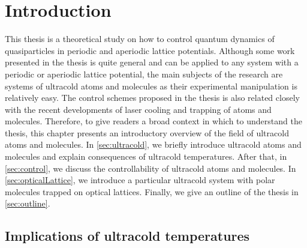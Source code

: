 
\chapter{Introduction}
\label{ch:Introduction}

This thesis is a theoretical study on how to control quantum dynamics of quasiparticles in periodic and aperiodic lattice potentials. 
Although some work presented in the thesis is quite general and can be applied to any system with a periodic or aperiodic lattice potential, 
the main subjects of the research are systems of ultracold atoms and molecules as their experimental manipulation is 
relatively easy. The control schemes proposed in the thesis is also related closely with the recent developments of laser 
cooling and trapping of atoms and molecules. Therefore, to give readers a broad context in which to understand the 
thesis, this chapter presents an introductory overview of the field of ultracold atoms and molecules. In \autoref{sec:ultracold}, we briefly introduce ultracold  atoms and molecules and explain consequences of ultracold temperatures. After
that, in \autoref{sec:control}, we discuss the controllability of ultracold atoms and molecules. In
 \autoref{sec:opticalLattice}, we introduce a particular ultracold system with polar molecules trapped on optical lattices.  
Finally, we give an outline of the thesis in \autoref{sec:outline}. 

\section{Implications of ultracold temperatures}
\label{sec:ultracold}

